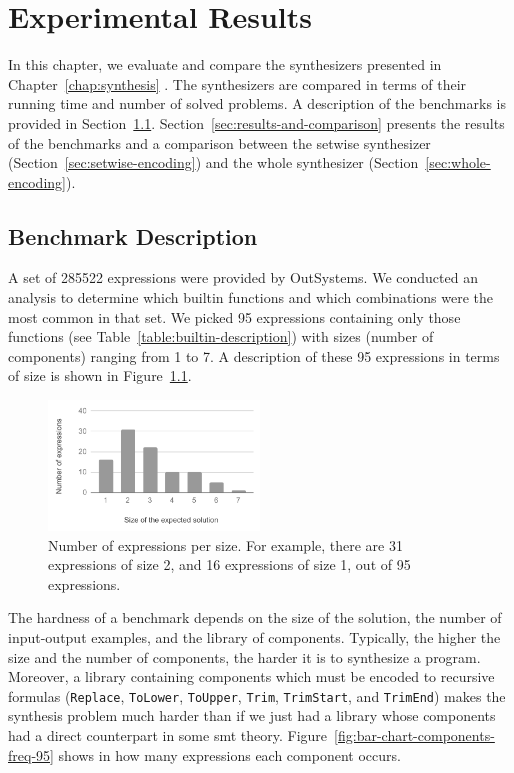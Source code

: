 \chapter{Experimental Results}
\label{chap:experimental-results}

In this chapter, we evaluate and compare the synthesizers presented in
Chapter~\ref{chap:synthesis} .
The synthesizers are compared in terms of their running time and number of
solved problems.
A description of the benchmarks is provided in Section~\ref{sec:bench-desc}.
Section~\ref{sec:results-and-comparison} presents the results of the benchmarks
and a comparison between the setwise synthesizer
(Section~\ref{sec:setwise-encoding}) and the whole synthesizer
(Section~\ref{sec:whole-encoding}).

\section{Benchmark Description}
\label{sec:bench-desc}

A set of 285522 expressions were provided by OutSystems.
We conducted an analysis to determine which builtin functions and which
combinations were the most common in that set.
We picked 95 expressions containing only those functions (see
Table~\ref{table:builtin-description}) with sizes (number of components) ranging
from 1 to 7.
A description of these 95 expressions in terms of size is shown in
Figure~\ref{fig:bar-chart-sizes-95}.

\begin{figure}
  \centering
  \includegraphics[width=0.5\textwidth]{assets/bar-chart-sizes-95.pdf}
  \caption{Number of expressions per size. For example, there are 31
    expressions of size 2, and 16 expressions of size 1, out of 95 expressions.}
  \label{fig:bar-chart-sizes-95}
\end{figure}

The hardness of a benchmark depends on the size of the solution, the number of
input-output examples, and the library of components.
Typically, the higher the size and the number of components, the harder it is to
synthesize a program.
Moreover, a library containing components which must be encoded to recursive
formulas (\lstinline{Replace}, \lstinline{ToLower}, \lstinline{ToUpper},
\lstinline{Trim}, \lstinline{TrimStart}, and \lstinline{TrimEnd}) makes the
synthesis problem much harder than if we just had a library whose components
had a direct counterpart in some \gls{smt} theory.
Figure~\ref{fig:bar-chart-components-freq-95} shows in how many expressions each
component occurs.

